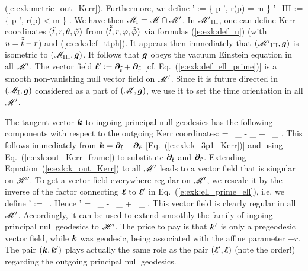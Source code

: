 (\ref{e:exk:metric_out_Kerr}). Furthermore, we define
\be
    \Hor' := \left\{ p \in \M', \quad r(p) = m \right\}
    \qand
    {\M'}_{\rm III} := \left\{ p \in \M', \quad r(p) < m \right\} .
\ee
We have then $\mathscr{M}_{\rm I} = \mathscr{M} \cap \mathscr{M}'$.
In ${\mathscr{M}'}_{\rm III}$, one can define Kerr coordinates $({\tilde t},r,\theta,{\tilde\varphi})$
from $(\tilde{{\tilde t}},r,\varphi,\tilde{{\tilde\varphi}})$
via formulas (\ref{e:exk:def_u}) (with $u = \tilde{{\tilde t}} - r$) and (\ref{e:exk:def_ttph}).
It appears then immediately that $({\mathscr{M}'}_{\rm III}, \bm{g})$ is isometric to $(\mathscr{M}_{\rm III},\bm{g})$.
It follows that $\bm{g}$ obeys the vacuum Einstein equation in all $\mathscr{M}'$.
The vector field $\bm{\ell}' := \bm{\partial}_{\tilde{{\tilde t}}} + \bm{\partial}_{\tilde{\tilde{r}}}$
[cf. Eq.~(\ref{e:exk:def_ell_prime})] is a smooth non-vanishing null vector
field on $\mathscr{M}'$. Since it is future directed in $(\mathscr{M}_{\rm I},\bm{g})$
considered as a part of $(\mathscr{M},\bm{g})$,
we use it to set the time orientation in all $\mathscr{M}'$.

The tangent vector $\bm{k}$ to ingoing principal null geodesics has
the following components with respect to the outgoing Kerr coordinates:
\be \label{e:exk:k_out_Kerr}
     =  \, \wpar_{\tilde{\ti}}
    - \wpar_{} +  \, \wpar_{\tilde{\tph}} .
\ee
This follows immediately from
$\bm{k} = \bm{\partial}_{{\tilde t}} - \bm{\partial}_{\tilde{r}}$ [Eq.~(\ref{e:exk:k_3p1_Kerr})]
and using Eq.~(\ref{e:exk:out_Kerr_frame})
to substitute $\bm{\partial}_{{\tilde t}}$ and $\bm{\partial}_{\tilde{r}}$.
Extending Equation~(\ref{e:exk:k_out_Kerr}) to all $\mathscr{M}'$
leads to a vector field that is singular on $\mathscr{H}'$. To get a vector field
everywhere regular on $\mathscr{M}'$, we rescale it by the inverse of the factor
connecting $\bm{\ell}$ to $\bm{\ell}'$ in Eq.~(\ref{e:exk:ell_prime_ell}), i.e. we
define
\be
    ' :=  \,  .
\ee
Hence
\be \label{e:exk:k_prime_out_Kerr}
    ' =  \, \wpar_{\tilde{\ti}}
    - \, \wpar_{} +  \, \wpar_{\tilde{\tph}} .
\ee
This vector field is clearly regular in all $\mathscr{M}'$.
Accordingly, it can be used to extend smoothly the family of ingoing principal
null geodesics to $\mathscr{H}'$. The price to pay is that $\bm{k}'$ is only a pregeodesic
vector field, while $\bm{k}$ was geodesic, being associated with the affine parameter $-r$.
The pair $(\bm{k}, \bm{k}')$ plays actually the same role as the pair $(\bm{\ell}', \bm{\ell})$
(note the order!) regarding the outgoing principal null geodesics.

